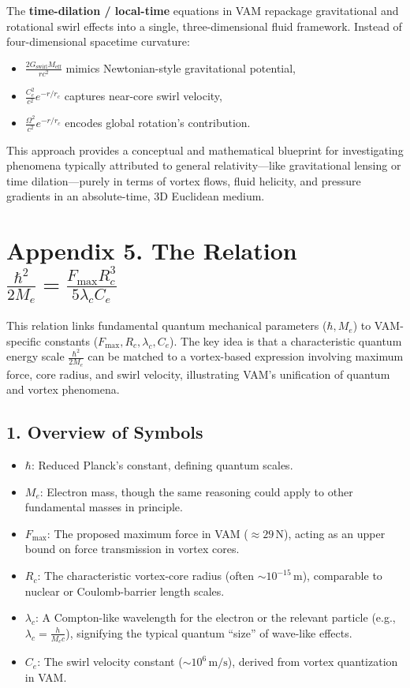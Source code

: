 \documentclass[aps,preprint,superscriptaddress]{revtex4-2}
\begin{document}
    The \textbf{time-dilation / local-time} equations in VAM repackage gravitational and rotational swirl effects into a single, three-dimensional fluid framework. Instead of four-dimensional spacetime curvature:
    \begin{itemize}
        \item \(\tfrac{2 G_{\text{swirl}} M_{\text{eff}}}{r c^2}\) mimics Newtonian-style gravitational potential,
        \item \(\tfrac{C_e^2}{c^2} e^{-r/r_c}\) captures near-core swirl velocity,
        \item \(\tfrac{\Omega^2}{c^2} e^{-r/r_c}\) encodes global rotation’s contribution.
    \end{itemize}

    This approach provides a conceptual and mathematical blueprint for investigating phenomena typically attributed to general relativity—like gravitational lensing or time dilation—purely in terms of vortex flows, fluid helicity, and pressure gradients in an absolute-time, 3D Euclidean medium.

    \section*{Appendix 5. The Relation \(\frac{\hbar^2}{2 M_e} = \frac{F_{\text{max}} R_c^3}{5  \lambda_c  C_e} \)}

    This relation links fundamental quantum mechanical parameters (\(\hbar, M_e\)) to VAM-specific constants (\(F_{\max}, R_c, \lambda_c, C_e\)). The key idea is that a characteristic quantum energy scale \(\tfrac{\hbar^2}{2M_e}\) can be matched to a vortex-based expression involving maximum force, core radius, and swirl velocity, illustrating VAM’s unification of quantum and vortex phenomena.

    \subsection*{1. Overview of Symbols}

    \begin{itemize}
        \item \(\hbar\): Reduced Planck’s constant, defining quantum scales.
        \item \(M_e\): Electron mass, though the same reasoning could apply to other fundamental masses in principle.
        \item \(F_{\text{max}}\): The proposed maximum force in VAM (\(\approx 29\,\mathrm{N}\)), acting as an upper bound on force transmission in vortex cores.
        \item \(R_c\): The characteristic vortex-core radius (often \(\sim 10^{-15}\,\mathrm{m}\)), comparable to nuclear or Coulomb-barrier length scales.
        \item \(\lambda_c\): A Compton-like wavelength for the electron or the relevant particle (e.g., \(\lambda_c = \tfrac{h}{M_e c}\)), signifying the typical quantum “size” of wave-like effects.
        \item \(C_e\): The swirl velocity constant (\(\sim 10^6\,\mathrm{m/s}\)), derived from vortex quantization in VAM.
    \end{itemize}
\end{document}

